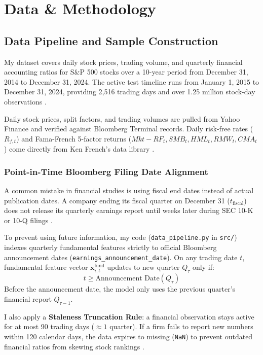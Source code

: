 \chapter{Data \& Methodology}
\label{ch:data_and_methodology}

\section{Data Pipeline and Sample Construction}
My dataset covers daily stock prices, trading volume, and quarterly financial accounting ratios for S\&P 500 stocks over a 10-year period from December 31, 2014 to December 31, 2024. The active test timeline runs from January 1, 2015 to December 31, 2024, providing 2,516 trading days and over 1.25 million stock-day observations \citep{gu2020empirical}.

Daily stock prices, split factors, and trading volumes are pulled from Yahoo Finance and verified against Bloomberg Terminal records. Daily risk-free rates ($R_{f,t}$) and Fama-French 5-factor returns ($Mkt-RF_t, SMB_t, HML_t, RMW_t, CMA_t$) come directly from Ken French's data library \citep{fama1993common, fama2015five, carhart1997on}.

\subsection{Point-in-Time Bloomberg Filing Date Alignment}
A common mistake in financial studies is using fiscal end dates instead of actual publication dates. A company ending its fiscal quarter on December 31 ($t_{\text{fiscal}}$) does not release its quarterly earnings report until weeks later during SEC 10-K or 10-Q filings \citep{lopez2018advances}.

To prevent using future information, my code (\texttt{data\_}\allowbreak\texttt{pipeline.py} in \texttt{src/}) indexes quarterly fundamental features strictly to official Bloomberg announcement dates (\texttt{earnings\_}\allowbreak\texttt{announcement\_}\allowbreak\texttt{date}). On any trading date $t$, fundamental feature vector $\mathbf{x}_{i,t}^{\text{fund}}$ updates to new quarter $Q_{\tau}$ only if:
\begin{equation}
t \ge \text{Announcement Date}(Q_{\tau})
\end{equation}
Before the announcement date, the model only uses the previous quarter's financial report $Q_{\tau-1}$.

I also apply a \textbf{Staleness Truncation Rule}: a financial observation stays active for at most 90 trading days ($\approx 1$ quarter). If a firm fails to report new numbers within 120 calendar days, the data expires to missing (\texttt{NaN}) to prevent outdated financial ratios from skewing stock rankings \citep{novy2016taxonomy}.


